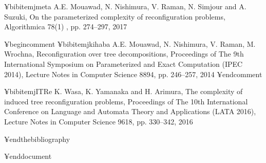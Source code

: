 ¥bibitem{jmeta}
A.E. Mouawad, N. Nishimura, V. Raman, N. Simjour and A. Suzuki, 
On the parameterized complexity of reconfiguration problems, 
Algorithmica 78(1) , pp. 274--297, 2017

¥begin{comment}
¥bibitem{jkihaba}
A.E. Mouawad, N. Nishimura, V. Raman, M. Wrochna, 
Reconfiguration over tree decompositions, 
Proceedings of The 9th International Symposium on Parameterized and Exact Computation (IPEC 2014), 
Lecture Notes in Computer Science 8894, pp. 246--257, 2014
¥end{comment}

¥bibitem{jITRe}
K. Wasa, K. Yamanaka and H. Arimura, 
The complexity of induced tree reconfiguration problems, 
Proceedings of The 10th International Conference on Language and Automata Theory and Applications (LATA 2016), Lecture Notes in Computer Science 9618, pp. 330--342, 2016

¥end{thebibliography}

¥end{document}